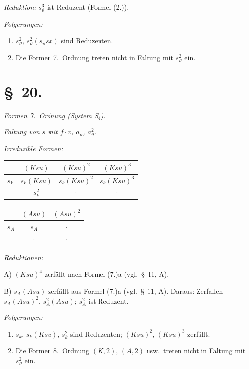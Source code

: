 \documentclass[12pt,a4paper]{article}
\begin{document}
\textit{Reduktion:} $s_\vartheta^3$ ist Reduzent (Formel (2.)).

\textit{Folgerungen:}
\begin{enumerate}
\item[1)] $s_\vartheta^2$, $s_\vartheta^2(s_\vartheta sx)$ sind Reduzenten.
\item[2)] Die Formen 7.\ Ordnung treten nicht in Faltung mit $s_\vartheta^2$ ein.
\end{enumerate}

\section*{\S\ 20.}

\textit{Formen 7.\ Ordnung (System S$_4$).}

\textit{Faltung von $s$ mit $f \cdot v$, $a_\vartheta$, $a_\vartheta^2$.}

\textit{Irreduzible Formen:}
\begin{center}
\begin{tabular}{c|ccc}
& $(Ksu)$ & $(Ksu)^2$ & $(Ksu)^3$ \\
\hline
$s_k$ & $s_k(Ksu)$ & $s_k(Ksu)^2$ & $s_k(Ksu)^3$ \\
& $s_k^2$ & $\cdot$ & $\cdot$
\end{tabular}
\end{center}

\begin{center}
\begin{tabular}{c|cc}
& $(Asu)$ & $(Asu)^2$ \\
\hline
$s_A$ & $s_A$ & $\cdot$ \\
& $\cdot$ & $\cdot$
\end{tabular}
\end{center}

\textit{Reduktionen:}

A) $(Ksu)^4$ zerfällt nach Formel (7.)a (vgl.\ \S\ 11, A).

B) $s_A(Asu)$ zerfällt aus Formel (7.)a (vgl.\ \S\ 11, A). Daraus: Zerfallen $s_A(Asu)^2$, $s_A^2(Asu)$; $s_A^2$ ist Reduzent.

\textit{Folgerungen:}
\begin{enumerate}
\item[1)] $s_k$, $s_k(Ksu)$, $s_k^2$ sind Reduzenten; $(Ksu)^2$, $(Ksu)^3$ zerfällt.
\item[2)] Die Formen 8.\ Ordnung $(K,2)$, $(A,2)$ usw.\ treten nicht in Faltung mit $s_\vartheta^2$ ein.
\end{enumerate}
\end{document}
